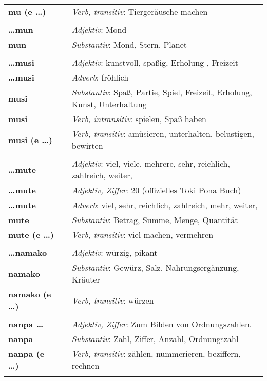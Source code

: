 \begin{supertabular}{p{2,5cm}|ll}
\textbf{mu (e \dots)} && \textit{Verb, transitiv}: Tiergeräusche machen \\ 
 && \\ %
\textbf{\dots mun} && \textit{Adjektiv}: Mond- \\ 
\textbf{mun} && \textit{Substantiv}: Mond, Stern, Planet \\ 
 && \\ %
\textbf{\dots musi} && \textit{Adjektiv}: kunstvoll, spaßig, Erholung-, Freizeit- \\ 
\textbf{\dots musi} && \textit{Adverb}: fröhlich \\ 
\textbf{musi} && \textit{Substantiv}: Spaß, Partie, Spiel, Freizeit, Erholung, Kunst, Unterhaltung \\ 
\textbf{musi} && \textit{Verb, intransitiv}: spielen, Spaß haben \\ 
\textbf{musi (e \dots)} && \textit{Verb, transitiv}: amüsieren, unterhalten, belustigen, bewirten \\ 
 && \\ %
\textbf{\dots mute} && \textit{Adjektiv}: viel, viele, mehrere, sehr, reichlich, zahlreich, weiter, \\ 
\textbf{\dots mute} && \textit{Adjektiv, Ziffer}: 20 (offizielles Toki Pona Buch) \\ 
\textbf{\dots mute} && \textit{Adverb}: viel, sehr, reichlich, zahlreich, mehr, weiter, \\ 
\textbf{mute} && \textit{Substantiv}: Betrag, Summe, Menge, Quantität \\ 
\textbf{mute (e \dots)} && \textit{Verb, transitiv}: viel machen, vermehren \\ 
 && \\ %
\textbf{\dots namako} && \textit{Adjektiv}: würzig, pikant \\ 
\textbf{namako} && \textit{Substantiv}: Gewürz, Salz, Nahrungsergänzung, Kräuter \\ 
\textbf{namako (e \dots)} && \textit{Verb, transitiv}: würzen \\ 
 && \\ %
\textbf{nanpa \dots} && \textit{Adjektiv, Ziffer}: Zum Bilden von Ordnungszahlen. \\ 
\textbf{nanpa} && \textit{Substantiv}: Zahl, Ziffer, Anzahl, Ordnungszahl \\ 
\textbf{nanpa (e \dots)} && \textit{Verb, transitiv}: zählen, nummerieren, beziffern, rechnen \\ 
 && \\ %

\end{supertabular}
